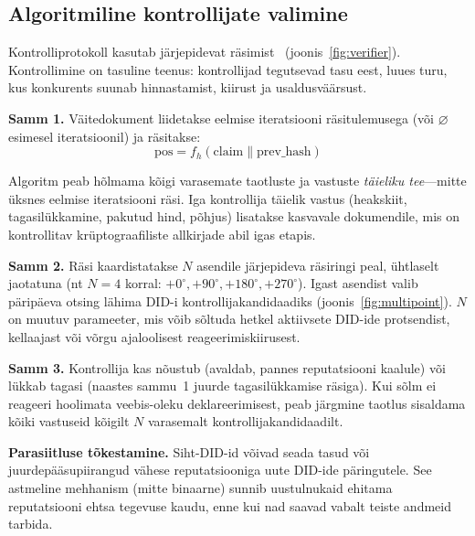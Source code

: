 \documentclass[11pt,a4paper,twocolumn]{article}
\begin{document}
\subsection{Algoritmiline kontrollijate valimine}

Kontrolliprotokoll kasutab järjepidevat räsimist~\cite{karger1997} (joonis~\ref{fig:verifier}). Kontrollimine on tasuline teenus: kontrollijad tegutsevad tasu eest, luues turu, kus konkurents suunab hinnastamist, kiirust ja usaldusväärsust.

\textbf{Samm 1.} Väitedokument liidetakse eelmise iteratsiooni räsitulemusega (või $\varnothing$ esimesel iteratsioonil) ja räsitakse:
\begin{equation}
\text{pos} = f_h(\text{claim} \| \text{prev\_hash})
\label{eq:hash}
\end{equation}

Algoritm peab hõlmama kõigi varasemate taotluste ja vastuste \emph{täieliku tee}---mitte üksnes eelmise iteratsiooni räsi. Iga kontrollija täielik vastus (heakskiit, tagasilükkamine, pakutud hind, põhjus) lisatakse kasvavale dokumendile, mis on kontrollitav krüptograafiliste allkirjade abil igas etapis.

\textbf{Samm 2.} Räsi kaardistatakse $N$ asendile järjepideva räsiringi peal, ühtlaselt jaotatuna (nt $N=4$ korral: $+0^{\circ}, +90^{\circ}, +180^{\circ}, +270^{\circ}$). Igast asendist valib päripäeva otsing lähima DID-i kontrollijakandidaadiks (joonis~\ref{fig:multipoint}). $N$ on muutuv parameeter, mis võib sõltuda hetkel aktiivsete DID-ide protsendist, kellaajast või võrgu ajaloolisest reageerimiskiirusest.

\textbf{Samm 3.} Kontrollija kas nõustub (avaldab, pannes reputatsiooni kaalule) või lükkab tagasi (naastes sammu~1 juurde tagasilükkamise räsiga). Kui sõlm ei reageeri hoolimata veebis-oleku deklareerimisest, peab järgmine taotlus sisaldama kõiki vastuseid kõigilt $N$ varasemalt kontrollijakandidaadilt.

\textbf{Parasiitluse tõkestamine.} Siht-DID-id võivad seada tasud või juurdepääsupiirangud vähese reputatsiooniga uute DID-ide päringutele. See astmeline mehhanism (mitte binaarne) sunnib uustulnukaid ehitama reputatsiooni ehtsa tegevuse kaudu, enne kui nad saavad vabalt teiste andmeid tarbida.
\end{document}
